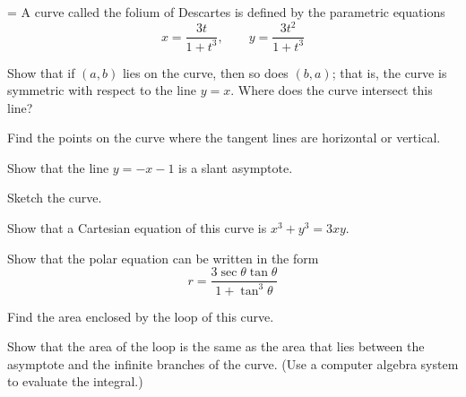 \documentclass[a4paper,12pt,twocolumn]{article}
\newlength{\problemnumberwidth}
\newcommand{\problem}[3]{%
  \Needspace{10\baselineskip}%
  \phantomsection\label{#1}%
  \par\vspace{0.8em}%
  \noindent
  \hangindent=\problemnumberwidth
  \hangafter=1
  \makebox[\problemnumberwidth][l]{\textbf{#2.}}#3\par
}
\begin{document}
\problem{prob:10-review-62}{62}{A curve called the folium of Descartes is defined by the parametric equations
\[
x=\frac{3t}{1+t^3},\qquad y=\frac{3t^2}{1+t^3}
\]
\begin{subparts}
\item Show that if \((a,b)\) lies on the curve, then so does \((b,a)\); that is, the curve is symmetric with respect to the line \(y=x\). Where does the curve intersect this line?
\item Find the points on the curve where the tangent lines are horizontal or vertical.
\item Show that the line \(y=-x-1\) is a slant asymptote.
\item Sketch the curve.
\item Show that a Cartesian equation of this curve is \(x^3+y^3=3xy\).
\item Show that the polar equation can be written in the form
\[
r=\frac{3\sec\theta\tan\theta}{1+\tan^3\theta}
\]
\item Find the area enclosed by the loop of this curve.
\item Show that the area of the loop is the same as the area that lies between the asymptote and the infinite branches of the curve. (Use a computer algebra system to evaluate the integral.)
\end{subparts}}
\end{document}
